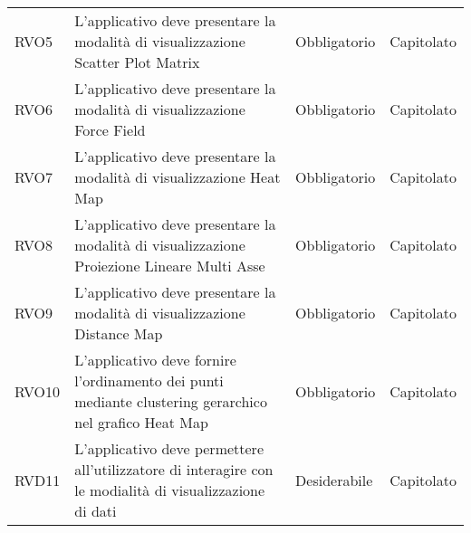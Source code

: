 \begin{longtable}[H]{>{\raggedright\arraybackslash}p{20mm} p{90mm} p{22mm} p{30mm}}
    RVO5
        & L'applicativo deve presentare la modalità di visualizzazione Scatter Plot Matrix
        & Obbligatorio
        & Capitolato \\

    RVO6
        & L'applicativo deve presentare la modalità di visualizzazione Force Field
        & Obbligatorio
        & Capitolato \\

    RVO7
        & L'applicativo deve presentare la modalità di visualizzazione Heat Map
        & Obbligatorio
        & Capitolato \\

    RVO8
        & L'applicativo deve presentare la modalità di visualizzazione Proiezione Lineare Multi Asse
        & Obbligatorio
        & Capitolato \\

    RVO9
        & L'applicativo deve presentare la modalità di visualizzazione Distance Map
        & Obbligatorio
        & Capitolato \\

    RVO10
        & L'applicativo deve fornire l'ordinamento dei punti mediante clustering gerarchico nel grafico Heat Map
        & Obbligatorio
        & Capitolato \\

    RVD11
        & L'applicativo deve permettere all'utilizzatore di interagire con le modialità di visualizzazione di dati
        & Desiderabile
        & Capitolato \\

\end{longtable}
